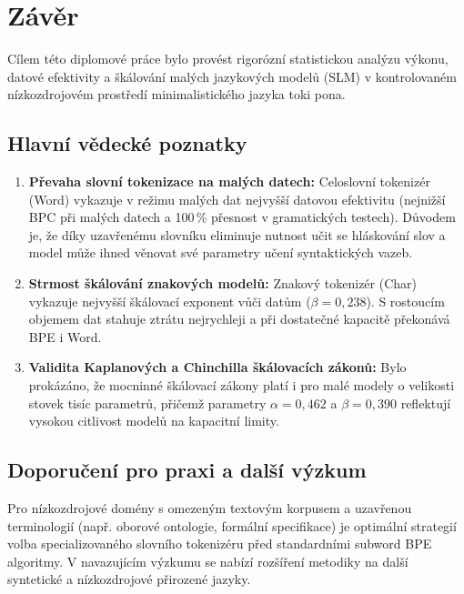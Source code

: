 \chapter{Závěr}
\label{chap:zaver}

Cílem této diplomové práce bylo provést rigorózní statistickou analýzu výkonu, datové efektivity a škálování malých jazykových modelů (SLM) v kontrolovaném nízkozdrojovém prostředí minimalistického jazyka toki pona.

\section{Hlavní vědecké poznatky}
\begin{enumerate}
    \item \textbf{Převaha slovní tokenizace na malých datech:} Celoslovní tokenizér (Word) vykazuje v režimu malých dat nejvyšší datovou efektivitu (nejnižší BPC při malých datech a 100\,\% přesnost v gramatických testech). Důvodem je, že díky uzavřenému slovníku eliminuje nutnost učit se hláskování slov a model může ihned věnovat své parametry učení syntaktických vazeb.
    \item \textbf{Strmost škálování znakových modelů:} Znakový tokenizér (Char) vykazuje nejvyšší škálovací exponent vůči datům ($\beta = 0{,}238$). S rostoucím objemem dat stahuje ztrátu nejrychleji a při dostatečné kapacitě překonává BPE i Word.
    \item \textbf{Validita Kaplanových a Chinchilla škálovacích zákonů:} Bylo prokázáno, že mocninné škálovací zákony platí i pro malé modely o velikosti stovek tisíc parametrů, přičemž parametry $\alpha = 0{,}462$ a $\beta = 0{,}390$ reflektují vysokou citlivost modelů na kapacitní limity.
\end{enumerate}

\section{Doporučení pro praxi a další výzkum}
Pro nízkozdrojové domény s omezeným textovým korpusem a uzavřenou terminologií (např. oborové ontologie, formální specifikace) je optimální strategií volba specializovaného slovního tokenizéru před standardními subword BPE algoritmy. V navazujícím výzkumu se nabízí rozšíření metodiky na další syntetické a nízkozdrojové přirozené jazyky.
